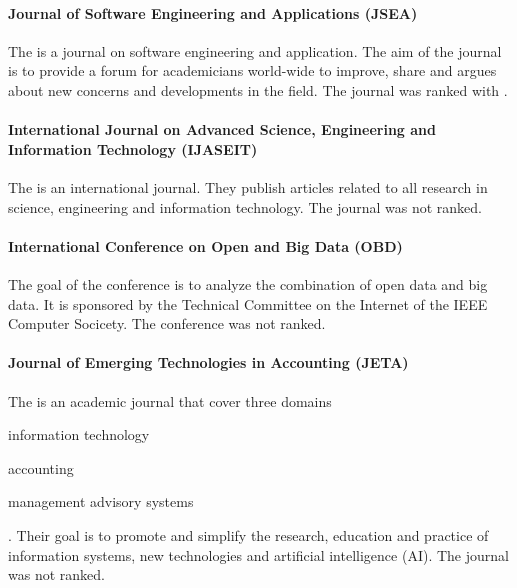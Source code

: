 \paragraph{Journal of Software Engineering and Applications (JSEA)}
The  is a journal on software engineering and application. The aim of the journal is to provide a forum for academicians world-wide to improve, share and argues about new concerns and developments in the field.
The journal was ranked with .
\paragraph{International Journal on Advanced Science, Engineering and Information Technology (IJASEIT)} The  is an international journal. They publish articles related to all research in science, engineering and information technology. The journal was not ranked.
\paragraph{International Conference on Open and Big Data (OBD)} The goal of the  conference is to analyze the combination of open data and big data. It is sponsored by the Technical Committee on the Internet of the IEEE Computer Socicety. The conference was not ranked.
\paragraph{Journal of Emerging Technologies in Accounting (JETA)}
The  is an academic journal that cover three domains
\begin{enumerate*}[label={\Alph*)},font={\color{red!50!black}\bfseries}]
	\item information technology
	\item accounting
	\item management advisory systems
\end{enumerate*}. 
Their goal is to promote and simplify the research, education and practice of information systems, new technologies and artificial intelligence (AI). The journal was not ranked.
